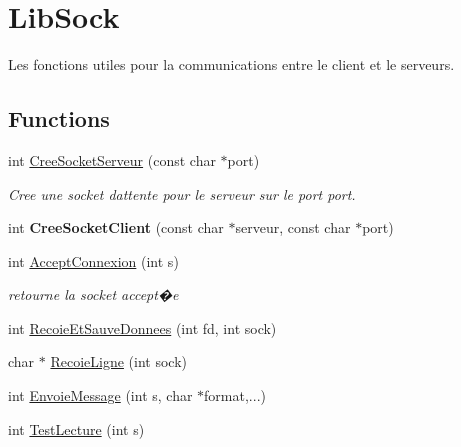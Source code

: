 \hypertarget{group__sock_lib}{}\section{Lib\+Sock}
\label{group__sock_lib}


Les fonctions utiles pour la communications entre le client et le serveurs.  


\subsection*{Functions}
\begin{DoxyCompactItemize}
\item 
int \hyperlink{group__sock_lib_ga8121aa8dd7fe1c345cd6addefa40281d}{Cree\+Socket\+Serveur} (const char $\ast$port)
\begin{DoxyCompactList}\small\item\em Cree une socket d\textquotesingle{}attente pour le serveur sur le port port. \end{DoxyCompactList}\item 
\hypertarget{group__sock_lib_ga2b1f3d897fd30b2f0df7fe2bd76509d9}{}int {\bfseries Cree\+Socket\+Client} (const char $\ast$serveur, const char $\ast$port)\label{group__sock_lib_ga2b1f3d897fd30b2f0df7fe2bd76509d9}

\item 
\hypertarget{group__sock_lib_gad4c89061f7a106e203d519efa2ca869a}{}int \hyperlink{group__sock_lib_gad4c89061f7a106e203d519efa2ca869a}{Accept\+Connexion} (int s)\label{group__sock_lib_gad4c89061f7a106e203d519efa2ca869a}

\begin{DoxyCompactList}\small\item\em retourne la socket accept�e \end{DoxyCompactList}\item 
int \hyperlink{group__sock_lib_ga86f7976d4005ff8c38a9f8f19d43d070}{Recoie\+Et\+Sauve\+Donnees} (int fd, int sock)
\item 
char $\ast$ \hyperlink{group__sock_lib_ga954224eeb3b54e20383d3ccdf4de5db3}{Recoie\+Ligne} (int sock)
\item 
int \hyperlink{group__sock_lib_ga443d2ded4b69530a3f4648e6e8b903e1}{Envoie\+Message} (int s, char $\ast$format,...)
\item 
int \hyperlink{group__sock_lib_ga04edb3bc7a730e2fe5a9560e9aa130f4}{Test\+Lecture} (int s)
\end{DoxyCompactItemize}


